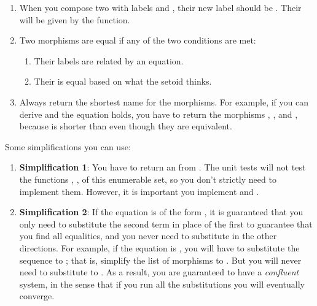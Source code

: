 \begin{enumerate}
    \item When you compose two  with labels  and , their new label should be .
          Their  will be given by the  function.
    \item Two morphisms are equal if any of the two conditions are met:
          \begin{enumerate}
              \item Their labels are related by an equation.
              \item Their  is equal based on what the setoid  thinks.
          \end{enumerate}
    \item Always return the shortest name for the morphisms.
          For example, if you can derive  and the equation  holds, you have to return the morphisms , , and , because  is shorter than  even though they are equivalent.
\end{enumerate}

Some simplifications you can use:

\begin{enumerate}
    \item \textbf{Simplification 1}:
          You have to return an \EnumerableSet from .
          The unit tests will not test the functions , ,  of this enumerable set, so you don't strictly need to implement them.
          However, it is important you implement  and .
    \item \textbf{Simplification 2}:
          If the equation is of the form , it is guaranteed that you only need to substitute the second term in place of the first to guarantee that you find all equalities, and you never need to substitute in the other directions.
          For example, if the equation is , you will have to substitute the sequence \pystr{[d, e]} to \pystr{[a,b,c]}; that is, simplify the list of morphisms \pystr{[a,a,b,c,a]} to \pystr{[a,d,e,a]}.
          But you will never need to substitute \pystr{[a,b,c]} to \pystr{[d,e]}.
          As a result, you are guaranteed to have a \emph{confluent} system, in the sense that if you run all the substitutions you will eventually converge.

\end{enumerate}
